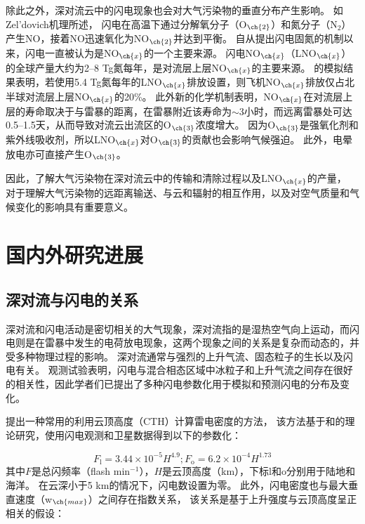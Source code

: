 除此之外，深对流云中的闪电现象也会对大气污染物的垂直分布产生影响。
如Zel'dovich机理所述\citep{Zeldovich.1967}，
闪电在高温下通过分解氧分子（O$_{\ch{2}}$）和氮分子（N$_2$）产生NO，接着NO迅速氧化为NO$_{\ch{2}}$并达到平衡。
自从\citet{Liebig.1827}提出闪电固氮的机制以来，闪电一直被认为是NO$_{\ch{x}}$的一个主要来源\citep{Hutchinson.1954}。
闪电NO$_{\ch{x}}$（LNO$_{\ch{x}}$）的全球产量大约为2–8 Tg氮每年，是对流层上层NO$_{\ch{x}}$的主要来源\citep{Galloway.2004,Schumann.2007}。
\citet{Grewe.2002}的模拟结果表明，若使用5.4 Tg氮每年的LNO$_{\ch{x}}$排放设置，则飞机NO$_{\ch{x}}$排放仅占北半球对流层上层NO$_{\ch{x}}$的20\%。
此外新的化学机制表明，NO$_{\ch{x}}$在对流层上层的寿命取决于与雷暴的距离，在雷暴附近该寿命为$\sim$3小时，而远离雷暴处可达0.5--1.5天\citep{Nault.2016,Nault.2017}，从而导致对流云出流区的O$_{\ch{3}}$浓度增大\citep{Pickering.1996,Hauglustaine.2001,DeCaria.2005}。
因为O$_{\ch{3}}$是强氧化剂和紫外线吸收剂\citep{Myhre.2013}，所以LNO$_{\ch{x}}$对O$_{\ch{3}}$的贡献也会影响气候强迫。
此外，电晕放电亦可直接产生O$_{\ch{3}}$\citep{Minschwaner.2008,Kotsakis.2017}。

因此，了解大气污染物在深对流云中的传输和清除过程以及LNO$_{\ch{x}}$的产量，
对于理解大气污染物的远距离输送、与云和辐射的相互作用，以及对空气质量和气候变化的影响具有重要意义。



\section{国内外研究进展}

\subsection{深对流与闪电的关系} \label{sec:lightning_convection}

深对流和闪电活动是密切相关的大气现象，深对流指的是湿热空气向上运动，而闪电则是在雷暴中发生的电荷放电现象，这两个现象之间的关系是复杂而动态的，并受多种物理过程的影响。
深对流通常与强烈的上升气流、固态粒子的生长以及闪电有关。
观测试验表明，闪电与混合相态区域中冰粒子和上升气流之间存在很好的相关性\citep{Williams.1989,Deierling.2008c,Deierling.2008d}，因此学者们已提出了多种闪电参数化用于模拟和预测闪电的分布及变化。

\citet{Price.1992}提出一种常用的利用云顶高度（CTH）计算雷电密度的方法，
该方法基于\citet{Vonnegut.1963}和\citet{Williams.1985}的理论研究，使用闪电观测和卫星数据得到以下的参数化：

\begin{equation} \label{eq:ltng_cth}
F_\mathrm{l} = 3.44\times10^{-5}H^{4.9};
F_\mathrm{o} = 6.2\times10^{-4}H^{1.73}
\end{equation}
其中$F$是总闪频率（flash min$^{-1}$），$H$是云顶高度（km），下标l和o分别用于陆地和海洋。
在云深小于5 km的情况下，闪电数设置为零。
此外，闪电密度也与最大垂直速度（w$_{\ch{max}}$）之间存在指数关系，
该关系是基于上升强度与云顶高度呈正相关的假设：


